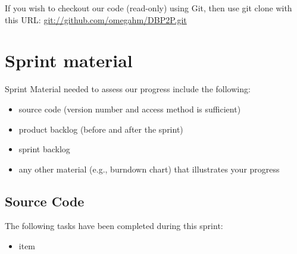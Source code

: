 \documentclass[a4paper,11pt]{article}
\begin{document}
If you wish to checkout our code (read-only) using Git, then use git clone with this URL:
\url{git://github.com/omegahm/DBP2P.git}


\section{Sprint material}
Sprint Material needed to assess our progress include the following:
\begin{itemize}
\item source code (version number and access method is sufficient)
\item product backlog (before and after the sprint)
\item sprint backlog
\item any other material (e.g., burndown chart) that illustrates your progress
\end{itemize}


\subsection{Source Code}



The following tasks have been completed during this sprint:
\begin{itemize}
	\item item
\end{itemize}

%
\end{document}

